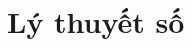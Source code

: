 \documentclass[../p/mo-nt-book.tex]{subfiles}
\begin{document}
\chapter{Lý thuyết số}

\newpage 

 \newpage
 \newpage
 \newpage
\end{document}
